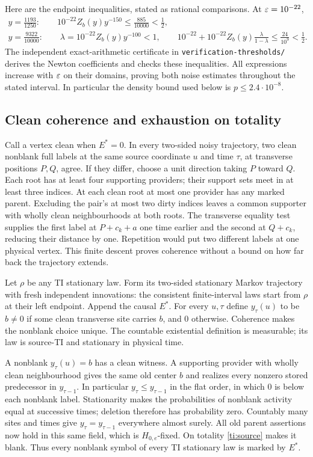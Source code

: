 Here are the endpoint inequalities, stated as rational comparisons. At $\varepsilon=10^{-22}$,
\[
 \begin{gathered}
 y=\frac{1193}{1250}:\qquad
 10^{-22}Z_b(y)y^{-150}\le\frac{885}{10000}<\frac12,\\
 y=\frac{9322}{10000}:\qquad
 \lambda=10^{-22}Z_b(y)y^{-100}<1,\qquad
 10^{-22}+10^{-22}Z_b(y)\frac\lambda{1-\lambda}\le\frac{24}{10^9}<\frac12.
 \end{gathered}
\]
The independent exact-arithmetic certificate in \texttt{verification-\allowbreak thresholds/} derives the Newton coefficients and checks these inequalities. All expressions increase with $\varepsilon$ on their domains, proving both noise estimates throughout the stated interval. In particular the density bound used below is $p\le2.4\cdot10^{-8}$.

\subsection{Clean coherence and exhaustion on totality}

Call a vertex clean when $E^*=0$. In every two-sided noisy trajectory, two clean nonblank full labels at the same source coordinate $u$ and time $\tau$, at transverse positions $P,Q$, agree. If they differ, choose a unit direction taking $P$ toward $Q$. Each root has at least four supporting providers; their support sets meet in at least three indices. At each clean root at most one provider has any marked parent. Excluding the pair's at most two dirty indices leaves a common supporter with wholly clean neighbourhoods at both roots. The transverse equality test supplies the first label at $P+c_k+a$ one time earlier and the second at $Q+c_k$, reducing their distance by one. Repetition would put two different labels at one physical vertex. This finite descent proves coherence without a bound on how far back the trajectory extends.

Let $\rho$ be any TI stationary law. Form its two-sided stationary Markov trajectory with fresh independent innovations: the consistent finite-interval laws start from $\rho$ at their left endpoint. Append the causal $E^*$. For every $u,\tau$ define $y_\tau(u)$ to be $b\ne0$ if some clean transverse site carries $b$, and $0$ otherwise. Coherence makes the nonblank choice unique. The countable existential definition is measurable; its law is source-TI and stationary in physical time.

A nonblank $y_\tau(u)=b$ has a clean witness. A supporting provider with wholly clean neighbourhood gives the same old center $b$ and realizes every nonzero stored predecessor in $y_{\tau-1}$. In particular $y_\tau\le y_{\tau-1}$ in the flat order, in which $0$ is below each nonblank label. Stationarity makes the probabilities of nonblank activity equal at successive times; deletion therefore has probability zero. Countably many sites and times give $y_\tau=y_{\tau-1}$ everywhere almost surely. All old parent assertions now hold in this same field, which is $H_{0,e}$-fixed. On totality \cref{ti:source} makes it blank. Thus every nonblank symbol of every TI stationary law is marked by $E^*$.

